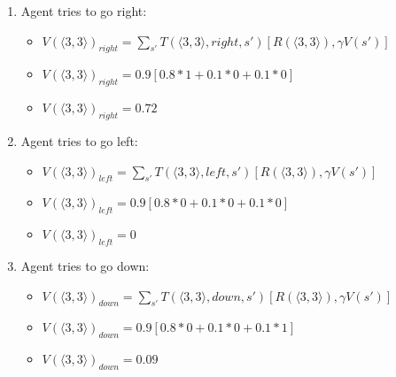 \documentclass[10pt,a4paper,twocolumn]{article}
\begin{document}
	
	\begin{enumerate}
		\item Agent tries to go right: 
		\begin{itemize}
			\item $V(\big \langle 3,3 \big \rangle)_{right} = \sum_{s'} T(\big \langle 3,3 \big \rangle, right, s') [R(\big \langle 3,3 \big \rangle), \gamma V(s')]$
		\end{itemize}
		\begin{itemize}
			\item $V(\big \langle 3,3 \big \rangle)_{right} = 0.9[0.8 * 1 + 0.1 * 0 + 0.1 * 0]$
		\end{itemize}
		\begin{itemize}
			\item $V(\big \langle 3,3 \big \rangle)_{right} = 0.72$
		\end{itemize}
		
		\item Agent tries to go left: 
		\begin{itemize}
			\item $V(\big \langle 3,3 \big \rangle)_{left} = \sum_{s'} T(\big \langle 3,3 \big \rangle, left, s') [R(\big \langle 3,3 \big \rangle), \gamma V(s')]$
		\end{itemize}
		\begin{itemize}
			\item $V(\big \langle 3,3 \big \rangle)_{left} = 0.9[0.8 * 0 + 0.1 * 0 + 0.1 * 0]$
		\end{itemize}
		\begin{itemize}
			\item $V(\big \langle 3,3 \big \rangle)_{left} = 0$
		\end{itemize}
	
		\item Agent tries to go down: 
		\begin{itemize}
			\item $V(\big \langle 3,3 \big \rangle)_{down} = \sum_{s'} T(\big \langle 3,3 \big \rangle, down, s') [R(\big \langle 3,3 \big \rangle), \gamma V(s')]$
		\end{itemize}
		\begin{itemize}
			\item $V(\big \langle 3,3 \big \rangle)_{down} = 0.9[0.8 * 0 + 0.1 * 0 + 0.1 * 1]$
		\end{itemize}
		\begin{itemize}
			\item $V(\big \langle 3,3 \big \rangle)_{down} = 0.09$
		\end{itemize}
	

\end{enumerate}
\end{document}
